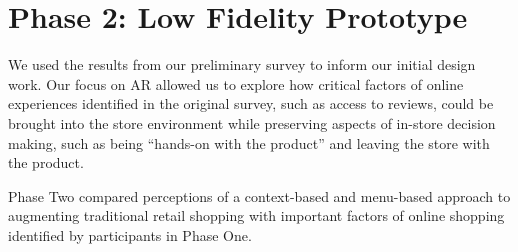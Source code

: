 \section{Phase 2: Low Fidelity Prototype}
We used the results from our preliminary survey to inform our initial design work. Our focus on AR allowed us to explore how critical factors of online experiences identified in the original survey, such as access to reviews, could be brought into the store environment while preserving aspects of in-store decision making, such as being ``hands-on with the product'' and leaving the store with the product. 

\begin{marginfigure}
	\begin{minipage}{\marginparwidth}
			\centering
			\vfill
		\caption{Phase Two compared perceptions of a context-based and menu-based approach to augmenting traditional retail shopping with important factors of online shopping identified by participants in Phase One. }
	\end{minipage}
\end{marginfigure}

